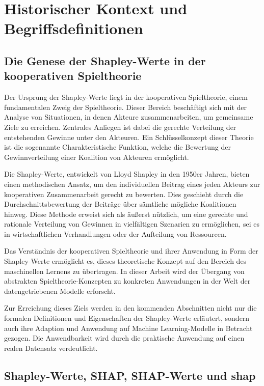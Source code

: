 \chapter{Historischer Kontext und Begriffsdefinitionen}



\section{Die Genese der Shapley-Werte in der kooperativen Spieltheorie}

Der Ursprung der Shapley-Werte liegt in der kooperativen Spieltheorie, einem fundamentalen Zweig der Spieltheorie. 
Dieser Bereich beschäftigt sich mit der Analyse von Situationen, in denen Akteure zusammenarbeiten, um gemeinsame Ziele zu erreichen. 
Zentrales Anliegen ist dabei die gerechte Verteilung der entstehenden Gewinne unter den Akteuren. Ein Schlüsselkonzept dieser Theorie 
ist die sogenannte \glqq{}Charakteristische Funktion\grqq{}, welche die Bewertung der Gewinnverteilung einer Koalition von Akteuren ermöglicht.

Die Shapley-Werte, entwickelt von Lloyd Shapley in den 1950er Jahren, bieten einen methodischen Ansatz, um den individuellen Beitrag 
eines jeden Akteurs zur kooperativen Zusammenarbeit gerecht zu bewerten. Dies geschieht durch die Durchschnittsbewertung der Beiträge 
über sämtliche mögliche Koalitionen hinweg. Diese Methode erweist sich als äußerst nützlich, um eine gerechte und rationale Verteilung 
von Gewinnen in vielfältigen Szenarien zu ermöglichen, sei es in wirtschaftlichen Verhandlungen oder der Aufteilung von Ressourcen.

Das Verständnis der kooperativen Spieltheorie und ihrer Anwendung in Form der Shapley-Werte ermöglicht es, dieses theoretische Konzept 
auf den Bereich des maschinellen Lernens zu übertragen. In dieser Arbeit wird der Übergang von abstrakten Spieltheorie-Konzepten 
zu konkreten Anwendungen in der Welt der datengetriebenen Modelle erforscht.

Zur Erreichung dieses Ziels werden in den kommenden Abschnitten nicht nur die formalen Definitionen und Eigenschaften der Shapley-Werte 
erläutert, sondern auch ihre Adaption und Anwendung auf Machine Learning-Modelle in Betracht gezogen. Die Anwendbarkeit wird durch die 
praktische Anwendung auf einen realen Datensatz verdeutlicht.


\section{Shapley-Werte, SHAP, SHAP-Werte und \textsf{shap}}

